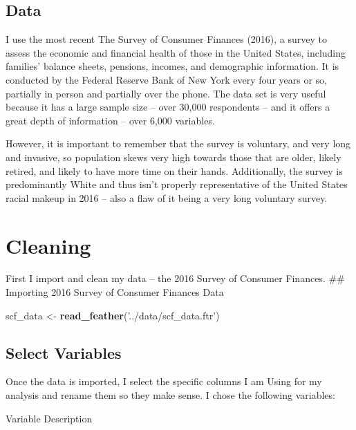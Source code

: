 \documentclass[
]{article}
\newenvironment{Shaded}{\begin{snugshade}}{\end{snugshade}}
\newcommand{\KeywordTok}[1]{\textcolor[rgb]{0.13,0.29,0.53}{\textbf{#1}}}
\newcommand{\NormalTok}[1]{#1}
\newcommand{\StringTok}[1]{\textcolor[rgb]{0.31,0.60,0.02}{#1}}
\begin{document}
\hypertarget{data}{%
\subsection{Data}\label{data}}

I use the most recent The Survey of Consumer Finances (2016), a survey
to assess the economic and financial health of those in the United
States, including families' balance sheets, pensions, incomes, and
demographic information. It is conducted by the Federal Reserve Bank of
New York every four years or so, partially in person and partially over
the phone. The data set is very useful because it has a large sample
size -- over 30,000 respondents -- and it offers a great depth of
information -- over 6,000 variables.

However, it is important to remember that the survey is voluntary, and
very long and invasive, so population skews very high towards those that
are older, likely retired, and likely to have more time on their hands.
Additionally, the survey is predominantly White and thus isn't properly
representative of the United States racial makeup in 2016 -- also a flaw
of it being a very long voluntary survey.

\hypertarget{cleaning}{%
\section{Cleaning}\label{cleaning}}

First I import and clean my data -- the 2016 Survey of Consumer
Finances. \#\# Importing 2016 Survey of Consumer Finances Data

\begin{Shaded}
\begin{Highlighting}[]
\NormalTok{scf_data <-}\StringTok{ }\KeywordTok{read_feather}\NormalTok{(}\StringTok{'../data/scf_data.ftr'}\NormalTok{)}
\end{Highlighting}
\end{Shaded}

\hypertarget{select-variables}{%
\subsection{Select Variables}\label{select-variables}}

Once the data is imported, I select the specific columns I am Using for
my analysis and rename them so they make sense. I chose the following
variables:

Variable Description
\end{document}
